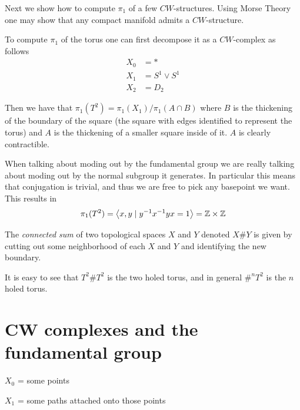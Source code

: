 \documentclass[11pt,leqno,oneside]{amsart}
\newenvironment{dateenv}{
  \vspace{1em}
}{
  \vspace{1em}
}
\newcommand{\mydate}[4]{
  \newdate{#1}{#2}{#3}{#4}
  \begin{dateenv}
    \hfill\displaydate{#1}
  \end{dateenv}
}
\numberwithin{thm}{section}
\begin{document}
Next we show how to compute \(\pi_1\) of a few
\(CW\)-structures. Using Morse Theory one may show that any compact
manifold admits a \(CW\)-structure.

To compute \(\pi_1\) of the torus one can first decompose it as a
\(CW\)-complex as follows
\begin{align*}
  X_0 &= *\\
  X_1 &= S^1 \vee S^1\\
  X_2 &= D_2
\end{align*}

Then we have that \(\pi_1(T^2) = \pi_1(X_1)/\pi_1(A \cap B)\) where
\(B\) is the thickening of the boundary of the square (the square with edges identified to represent the torus) and \(A\) is the thickening of a smaller square
inside of it. \(A\) is clearly contractible.

When talking about moding out by the fundamental group we are really
talking about moding out by the normal subgroup it generates. In
particular this means that conjugation is trivial, and thus we are
free to pick any basepoint we want. This results in
\[\pi_1(T^2) = \left\langle x,y \mid y^{-1}x^{-1}y x = 1 \right\rangle = {\mathbb Z}
    \times {\mathbb Z}\]

\begin{defn}
  The \emph{connected sum} of two topological spaces \(X\) and \(Y\)
  denoted \(X \# Y \) is given by cutting out some neighborhood of
  each \(X\) and \(Y\) and identifying the new boundary.
\end{defn}

It is easy to see that \(T^2 \# T^2\) is the two holed torus, and in general \(\#^n T^2\) is the \(n\) holed torus.

\mydate{e7}{8}{2}{2017}

\section{CW complexes and the fundamental group}

$X_0$ = some points

$X_1$ = some paths attached onto those points
\end{document}
